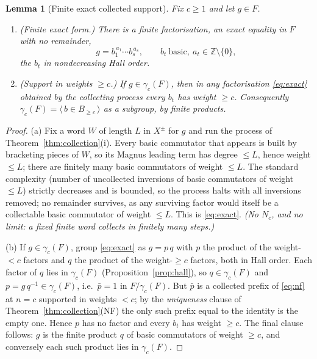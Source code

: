 \documentclass{amsart}
\newtheorem{lemma}{Lemma}
\theoremstyle{definition}
\theoremstyle{remark}
\begin{document}
\begin{lemma}[Finite exact collected support]\label{lem:support}
Fix $c\ge1$ and let $g\in F$.
\begin{enumerate}
\item[\textup{(a)}] \textup{(Finite exact form.)} There is a \emph{finite} factorisation, an
\emph{exact} equality in $F$ with no remainder,
\begin{equation}\label{eq:exact}
g=b_{1}^{\,a_1}\cdots b_{s}^{\,a_s},\qquad b_t\ \text{basic},\ a_t\in\mathbb Z\setminus\{0\},
\end{equation}
the $b_t$ in nondecreasing Hall order.
\item[\textup{(b)}] \textup{(Support in weights $\ge c$.)} If $g\in\gamma_c(F)$, then in any
factorisation \eqref{eq:exact} obtained by the collecting process every $b_t$ has weight
$\ge c$. Consequently $\gamma_c(F)=\big\langle\,b\in B_{\ge c}\,\big\rangle$ as a subgroup,
\emph{by finite products}.
\end{enumerate}
\end{lemma}
\begin{proof}
(a) Fix a word $W$ of length $L$ in $X^{\pm}$ for $g$ and run the process of
Theorem~\ref{thm:collection}(i). Every basic commutator that appears is built by bracketing
pieces of $W$, so its Magnus leading term has degree $\le L$, hence weight $\le L$; there are
finitely many basic commutators of weight $\le L$. The standard complexity (number of
uncollected inversions of basic commutators of weight $\le L$) strictly decreases and is
bounded, so the process halts with all inversions removed; no remainder survives, as any
surviving factor would itself be a collectable basic commutator of weight $\le L$. This is
\eqref{eq:exact}. \emph{(No $N_c$, and no limit: a fixed finite word collects in finitely many
steps.)}

(b) If $g\in\gamma_c(F)$, group \eqref{eq:exact} as $g=p\,q$ with $p$ the product of the
weight-$<c$ factors and $q$ the product of the weight-$\ge c$ factors, both in Hall order. Each
factor of $q$ lies in $\gamma_c(F)$ (Proposition~\ref{prop:hall}), so $q\in\gamma_c(F)$ and
$p=g\,q^{-1}\in\gamma_c(F)$, i.e.\ $\bar p=1$ in $F/\gamma_c(F)$. But $\bar p$ is a collected
prefix of \eqref{eq:nf} at $n=c$ supported in weights $<c$; by the \emph{uniqueness} clause of
Theorem~\ref{thm:collection}(NF) the only such prefix equal to the identity is the empty one.
Hence $p$ has no factor and every $b_t$ has weight $\ge c$. The final clause follows: $g$ is the
finite product $q$ of basic commutators of weight $\ge c$, and conversely each such product lies
in $\gamma_c(F)$.
\end{proof}
\end{document}
